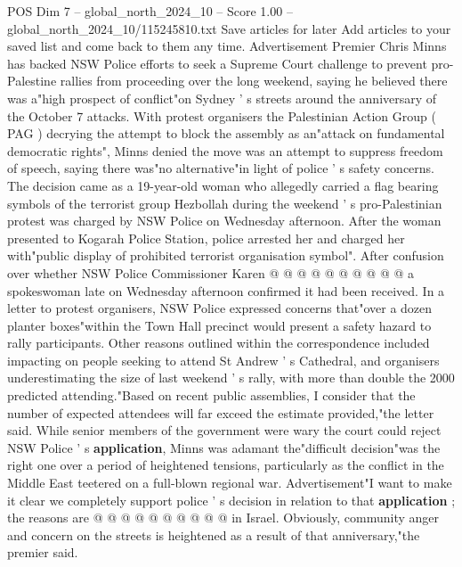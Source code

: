 \begin{textsample}{POS Dim 7 – global\_north\_2024\_10 – Score 1.00 – global\_north\_2024\_10/115245810.txt}  \label{ex:f7_pos_418}
Save articles for later Add articles to your saved list and come back to them any time.
Advertisement Premier Chris Minns has backed NSW Police efforts to seek a Supreme Court challenge to prevent pro-Palestine rallies from proceeding over the long weekend, saying he believed there was a"high prospect of conflict"on Sydney ' s streets around the anniversary of the October 7 attacks.
With protest organisers the Palestinian Action Group ( PAG ) decrying the attempt to block the assembly as an"attack on fundamental democratic rights", Minns denied the move was an attempt to suppress freedom of speech, saying there was"no alternative"in light of police ' s safety concerns.
The decision came as a 19-year-old woman who allegedly carried a flag bearing symbols of the terrorist group Hezbollah during the weekend ' s pro-Palestinian protest was charged by NSW Police on Wednesday afternoon.
After the woman presented to Kogarah Police Station, police arrested her and charged her with"public display of prohibited terrorist organisation symbol".
After confusion over whether NSW Police Commissioner Karen @ @ @ @ @ @ @ @ @ @ a spokeswoman late on Wednesday afternoon confirmed it had been received.
In a letter to protest organisers, NSW Police expressed concerns that"over a dozen planter boxes"within the Town Hall precinct would present a safety hazard to rally participants.
Other reasons outlined within the correspondence included impacting on people seeking to attend St Andrew ' s Cathedral, and organisers underestimating the size of last weekend ' s rally, with more than double the 2000 predicted attending."Based on recent public assemblies, I consider that the number of expected attendees will far exceed the estimate provided,"the letter said.
While senior members of the government were wary the court could reject NSW Police ' s \textbf{application}, Minns was adamant the"difficult decision"was the right one over a period of heightened tensions, particularly as the conflict in the Middle East teetered on a full-blown regional war.
Advertisement"I want to make it clear we completely support police ' s decision in relation to that \textbf{application} ; the reasons are @ @ @ @ @ @ @ @ @ @ in Israel.
Obviously, community anger and concern on the streets is heightened as a result of that anniversary,"the premier said.

\end{textsample}
